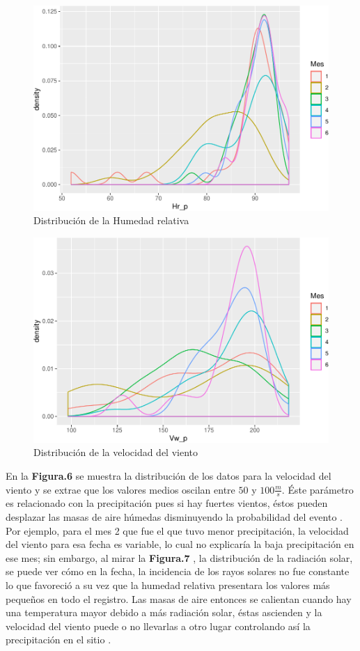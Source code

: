 \documentclass[conference,final,]{IEEEtran}
\makeatletter
\def\maxwidth{\ifdim\Gin@nat@width>\linewidth\linewidth
\else\Gin@nat@width\fi}
\let\Oldincludegraphics\includegraphics
\renewcommand{\includegraphics}[1]{\Oldincludegraphics[width=\maxwidth]{#1}}
\makeatother
\begin{document}
\begin{figure}
\centering
\includegraphics{Hidrology_files/figure-latex/unnamed-chunk-8-1.pdf}
\caption{Distribución de la Humedad relativa}
\end{figure}

\begin{figure}
\centering
\includegraphics{Hidrology_files/figure-latex/unnamed-chunk-11-1.pdf}
\caption{Distribución de la velocidad del viento}
\end{figure}

En la \textbf{Figura.6} se muestra la distribución de los datos para la
velocidad del viento y se extrae que los valores medios oscilan entre
\(50\) y \(100 \frac{m}{s}\). Éste parámetro es relacionado con la
precipitación pues si hay fuertes vientos, éstos pueden desplazar las
masas de aire húmedas disminuyendo la probabilidad del evento
\citep{tobon}. Por ejemplo, para el mes 2 que fue el que tuvo menor
precipitación, la velocidad del viento para esa fecha es variable, lo
cual no explicaría la baja precipitación en ese mes; sin embargo, al
mirar la \textbf{Figura.7} , la distribución de la radiación solar, se
puede ver cómo en la fecha, la incidencia de los rayos solares no fue
constante lo que favoreció a su vez que la humedad relativa presentara
los valores más pequeños en todo el registro. Las masas de aire entonces
se calientan cuando hay una temperatura mayor debido a más radiación
solar, éstas ascienden y la velocidad del viento puede o no llevarlas a
otro lugar controlando así la precipitación en el sitio \citep{tobon}.
\end{document}
